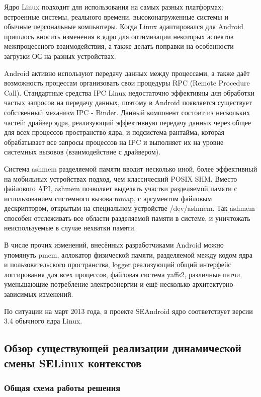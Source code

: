 Ядро Linux подходит для использования на самых разных платформах:
встроенные системы, реального времени, высоконагруженные системы и
обычные персональные компьютеры. Когда Linux адаптировался для Android
пришлось вносить изменения в ядро для оптимизации некоторых аспектов
межпроцессного взаимодействия, а также делать поправки на особенности
загрузки ОС на разных устройствах.

Android активно используют передачу данных между процессами, а также
даёт возможность процессам организовать свои процедуры RPC (Remote
Procedure Call). Стандартные средства IPC Linux недостаточно эффективны
для обработки частых запросов на передачу данных, поэтому в Android
появляется существует собственный механизм IPC - Binder. Данный
компонент состоит из нескольких частей: драйвер ядра, реализующий
эффективную передачу данных через общее для всех процессов пространство
ядра, и подсистема рантайма, которая обрабатывает все запросы процессов
на IPC и выполняет их на уровне системных вызовов (взаимодействие с
драйвером).

Система ashmem разделяемой памяти вводит несколько иной, более
эффективный на мобильных устройствах подход, чем классический POSIX SHM.
Вместо файлового API, ashmem позволяет выделять участки разделяемой
памяти с использованием системного вызова mmap, с аргументом файловым
дескриптором, открытым на специальном устройстве /dev/ashmem. Так ashmem
способен отслеживать все области разделяемой памяти в системе, и
уничтожать неиспользуемые в случае нехватки памяти.

В числе прочих изменений, внесённых разработчиками Android можно
упомянуть pmem, аллокатор физической памяти, разделяемой между кодом
ядра и пользовательского пространства, logger реализующий общий
интерфейс логгирования для всех процессов, файловая система yaffs2,
различные патчи, уменьшающие потребление электроэнергии и ещё несколько
архитектурно-зависимых изменений.

По ситуации на март 2013 года, в проекте SEAndroid ядро соответствует 
версии 3.4 обычного ядра Linux.

\subsection{Обзор существующей реализации динамической смены SELinux
контекстов}

\subsubsection{Общая схема работы решения}

